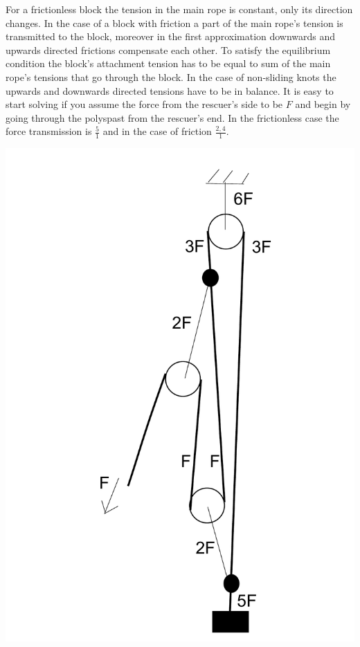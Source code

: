 \solueng
For a frictionless block the tension in the main rope is constant, only its direction changes. In the case of a block with friction a part of the main rope’s tension is transmitted to the block, moreover in the first approximation downwards and upwards directed frictions compensate each other. To satisfy the equilibrium condition the block’s attachment tension has to be equal to sum of the main rope’s tensions that go through the block. In the case of non-sliding knots the upwards and downwards directed tensions have to be in balance. It is easy to start solving if you assume the force from the rescuer’s side to be $F$ and begin by going through the polyspast from the rescuer’s end. In the frictionless case the force transmission is $\frac{5}{1}$ and in the case of friction $\frac{2,4}{1}$. 
\begin{center}
\includegraphics[scale=0.25]{2014-v3g-06-PolyspastL1}

\end{center}
